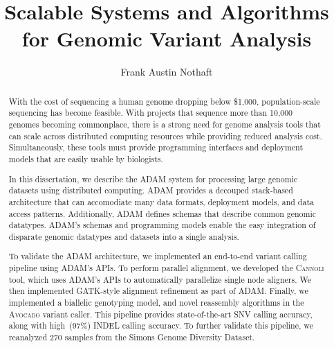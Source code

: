\documentclass[phd]{ucbthesis}
\begin{document}
\frontmatter

\title{Scalable Systems and Algorithms for Genomic Variant Analysis}
\author{Frank Austin Nothaft}

\maketitle

\approvalpage
\copyrightpage

\begin{abstract}
  With the cost of sequencing a human genome dropping below \$1,000,
  population-scale sequencing has become feasible. With projects that sequence
  more than 10,000 genomes becoming commonplace, there is a strong need for
  genome analysis tools that can scale across distributed computing
  resources while providing reduced analysis cost. Simultaneously, these tools
  must provide programming interfaces and deployment models that are easily
  usable by biologists.

  In this dissertation, we describe the \textsc{ADAM} system for processing
  large genomic datasets using distributed computing. \textsc{ADAM} provides
  a decouped stack-based architecture that can accomodiate many data formats,
  deployment models, and data access patterns. Additionally, \textsc{ADAM}
  defines schemas that describe common genomic datatypes. \textsc{ADAM}'s
  schemas and programming models enable the easy integration of disparate
  genomic datatypes and datasets into a single analysis.

  To validate the \textsc{ADAM} architecture, we implemented an end-to-end
  variant calling pipeline using \textsc{ADAM}'s APIs. To perform parallel
  alignment, we developed the \textsc{Cannoli} tool, which uses \textsc{ADAM}'s
  APIs to automatically parallelize single node aligners. We then
  implemented \textsc{GATK}-style alignment refinement as part of \textsc{ADAM}.
  Finally, we implemented a biallelic genotyping model, and novel reassembly
  algorithms in the \textsc{Avocado} variant caller. This pipeline provides
  state-of-the-art SNV calling accuracy, along with high~(97\%) INDEL calling
  accuracy. To further validate this pipeline, we reanalyzed 270 samples from
  the Simons Genome Diversity Dataset.
\end{abstract}
\end{document}

